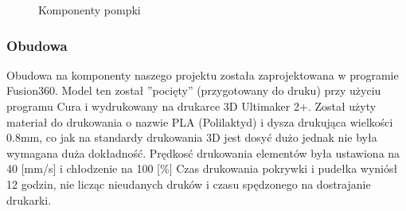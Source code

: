 \documentclass[12pt]{article}
\begin{document}
\begin{figure}[!h]
\centering
{}
\quad
{}
\quad
{}
\caption{Komponenty pompki}

\end{figure}



\newpage
\subsubsection{Obudowa}
Obudowa na komponenty naszego projektu została zaprojektowana w programie Fusion360. Model ten został ''pocięty'' (przygotowany do druku) przy użyciu programu Cura i wydrukowany na drukarce 3D Ultimaker 2+. Został użyty materiał do drukowania o nazwie PLA (Polilaktyd) i dysza drukująca wielkości 0.8mm, co jak na standardy drukowania 3D jest dosyć dużo jednak nie była wymagana duża dokładność. Prędkosć drukowania elementów była ustawiona na 40 [mm/s] i chłodzenie na 100 [\%]
Czas drukowania pokrywki i pudełka wyniósł 12 godzin, nie licząc nieudanych druków i czasu spędzonego na dostrajanie drukarki.
\end{document}
